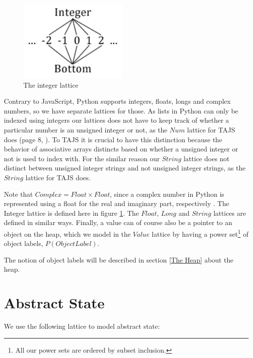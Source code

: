 \begin{figure}
	\vspace{-20pt}
	\begin{center}
		\includegraphics[width=0.48\textwidth]{images/integer-lattice.png}
	\end{center}
	\vspace{-10pt}
	\caption{The integer lattice}
	\label{fig:latticeInteger}
	\vspace{-10pt}
\end{figure}

Contrary to JavaScript, Python supports integers, floats, longs and complex numbers, so we have separate lattices for those. As lists in Python can only be indexed using integers our lattices does not have to keep track of whether a particular number is an unsigned integer or not, as the $Num$ lattice for TAJS does (page 8, \cite{tajs}). To TAJS it is crucial to have this distinction because the behavior of associative arrays distincts based on whether a unsigned integer or not is used to index with. For the similar reason our $String$ lattice does not distinct between unsigned integer strings and not unsigned integer strings, as the $String$ lattice for TAJS does.

Note that $Complex = Float \times Float$, since a complex number in Python is represented using a float for the real and imaginary part, respectively \cite{pyref.stdtypes}. The Integer lattice is defined here in figure \ref{fig:latticeInteger}. The $Float$, $Long$ and $String$ lattices are defined in similar ways. Finally, a value can of course also be a pointer to an object on the heap, which we model in the $Value$ lattice by having a power set\footnote{All our power sets are ordered by subset inclusion.} of object labels, $P(ObjectLabel)$.

The notion of object labels will be described in section \ref{The Heap} about the heap.


\section{Abstract State}
We use the following lattice to model abstract state:

